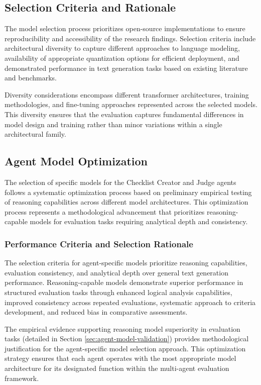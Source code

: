 \subsection{Selection Criteria and Rationale}

The model selection process prioritizes open-source implementations to ensure reproducibility and accessibility of the research findings. Selection criteria include architectural diversity to capture different approaches to language modeling, availability of appropriate quantization options for efficient deployment, and demonstrated performance in text generation tasks based on existing literature and benchmarks.

Diversity considerations encompass different transformer architectures, training methodologies, and fine-tuning approaches represented across the selected models. This diversity ensures that the evaluation captures fundamental differences in model design and training rather than minor variations within a single architectural family.

\subsection{Agent Model Optimization}

The selection of specific models for the Checklist Creator and Judge agents follows a systematic optimization process based on preliminary empirical testing of reasoning capabilities across different model architectures. This optimization process represents a methodological advancement that prioritizes reasoning-capable models for evaluation tasks requiring analytical depth and consistency.

\subsubsection{Performance Criteria and Selection Rationale}

The selection criteria for agent-specific models prioritize reasoning capabilities, evaluation consistency, and analytical depth over general text generation performance. Reasoning-capable models demonstrate superior performance in structured evaluation tasks through enhanced logical analysis capabilities, improved consistency across repeated evaluations, systematic approach to criteria development, and reduced bias in comparative assessments.

The empirical evidence supporting reasoning model superiority in evaluation tasks (detailed in Section \ref{sec:agent-model-validation}) provides methodological justification for the agent-specific model selection approach. This optimization strategy ensures that each agent operates with the most appropriate model architecture for its designated function within the multi-agent evaluation framework.


